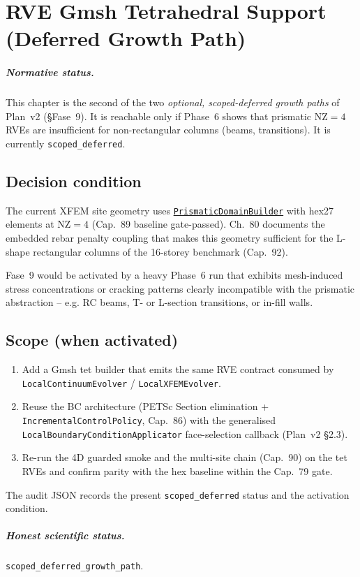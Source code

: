 
\chapter{RVE Gmsh Tetrahedral Support (Deferred Growth Path)}
\label{ch:rve-gmsh-tet-support}

\paragraph{Normative status.}
This chapter is the second of the two \emph{optional, scoped-deferred
growth paths} of Plan~v2 (\S Fase~9). It is reachable only if Phase~6
shows that prismatic \(\mathrm{NZ}=4\) RVEs are insufficient for
non-rectangular columns (beams, transitions). It is currently
\texttt{scoped\_deferred}.

\section{Decision condition}

The current XFEM site geometry uses
\href{run:src/model/PrismaticDomainBuilder.hh}{%
\texttt{PrismaticDomainBuilder}} with hex27 elements at
\(\mathrm{NZ}=4\) (Cap.~89 baseline gate-passed). Ch.~80 documents
the embedded rebar penalty coupling that makes this geometry
sufficient for the L-shape rectangular columns of the 16-storey
benchmark (Cap.~92).

Fase~9 would be activated by a heavy Phase~6 run that exhibits
mesh-induced stress concentrations or cracking patterns clearly
incompatible with the prismatic abstraction -- e.g. RC beams,
T- or L-section transitions, or in-fill walls.

\section{Scope (when activated)}

\begin{enumerate}
  \item Add a Gmsh tet builder that emits the same RVE contract
        consumed by \texttt{LocalContinuumEvolver} /
        \texttt{LocalXFEMEvolver}.
  \item Reuse the BC architecture (PETSc Section elimination +
        \texttt{IncrementalControlPolicy}, Cap.~86) with the
        generalised \texttt{LocalBoundaryConditionApplicator}
        face-selection callback (Plan~v2 \S2.3).
  \item Re-run the 4D guarded smoke and the multi-site chain
        (Cap.~90) on the tet RVEs and confirm parity with the hex
        baseline within the Cap.~79 gate.
\end{enumerate}

The audit JSON
records the present \texttt{scoped\_deferred} status and the
activation condition.

\paragraph{Honest scientific status.} \texttt{scoped\_deferred\_growth\_path}.
